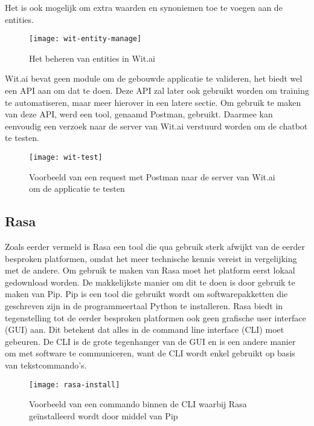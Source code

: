 Het is ook mogelijk om extra waarden en synoniemen toe te voegen aan de entities.

\begin{figure}[H]
    \label{fig:wit-intent-manage}
    \centering
    \texttt{[image: wit-entity-manage]}
    \caption{Het beheren van entities in Wit.ai}
\end{figure}

Wit.ai bevat geen module om de gebouwde applicatie te valideren, het biedt wel een API aan om dat te doen. Deze API zal later ook gebruikt worden om training te automatiseren, maar meer hierover in een latere sectie. Om gebruik te maken van deze API, werd een tool, genaamd Postman, gebruikt. Daarmee kan eenvoudig een verzoek naar de server van Wit.ai verstuurd worden om de chatbot te testen.

\begin{figure}[H]
    \label{fig:wit-test}
    \centering
    \texttt{[image: wit-test]}
    \caption{Voorbeeld van een request met Postman naar de server van Wit.ai om de applicatie te testen}
\end{figure}

\subsection{Rasa}
\label{subsec:werking-platformen-rasa}

Zoals eerder vermeld is Rasa een tool die qua gebruik sterk afwijkt van de eerder besproken platformen, omdat het meer technische kennis vereist in vergelijking met de andere. Om gebruik te maken van Rasa moet het platform eerst lokaal gedownload worden. De makkelijkste manier om dit te doen is door gebruik te maken van Pip. Pip is een tool die gebruikt wordt om softwarepakketten die geschreven zijn in de programmeertaal Python te installeren. Rasa biedt in tegenstelling tot de eerder besproken platformen ook geen grafische user interface (GUI) aan. Dit betekent dat alles in de command line interface (CLI) moet gebeuren. De CLI is de grote tegenhanger van de GUI en is een andere manier om met software te communiceren, want de CLI wordt enkel gebruikt op basis van tekstcommando's.

\begin{figure}[H]
    \label{fig:rasa-install}
    \centering
    \texttt{[image: rasa-install]}
    \caption{Voorbeeld van een commando binnen de CLI waarbij Rasa geïnstalleerd wordt door middel van Pip}
\end{figure}

